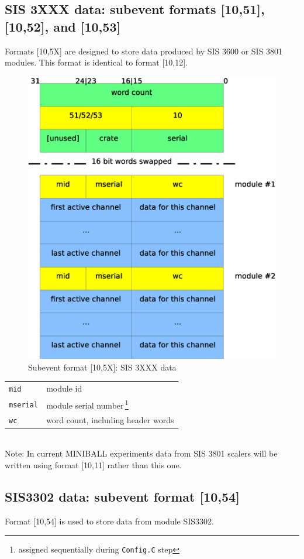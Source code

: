 \documentclass[10pt,a4paper]{article}
\begin{document}
\subsection{SIS 3XXX data: subevent formats [10,51], [10,52], and [10,53]}
Formats [10,5X] are designed to store data produced by SIS 3600 or SIS 3801 modules.
This format is identical to format [10,12].
\begin{figure}[H]
\centerline{\includegraphics[width=.5\linewidth]{MedSevt_SIS}}
\caption{Subevent format [10,5X]: SIS 3XXX data}
\label{MedSevt_SIS}
\end{figure}
\begin{minipage}{\linewidth}
\begin{table}[H]
\begin{center}
\begin{tabular}{ll}
\hline
\verb+mid+ & module id\\
\verb+mserial+ & module serial number\,\footnote{assigned sequentially during \texttt{Config.C} step} \\
\verb+wc+ & word count, including header words \\
\hline
\end{tabular}
\end{center}
\label{MedSevt_SIS_Legend}
\end{table}
\end{minipage}
\vspace{5mm}\\
Note: In current MINIBALL experiments data from
SIS 3801 scalers will be written using format [10,11] rather than this one.
\newpage
\subsection{SIS3302 data: subevent format [10,54]}
Format [10,54] is used to store data from module SIS3302.
\newpage
\end{document}
